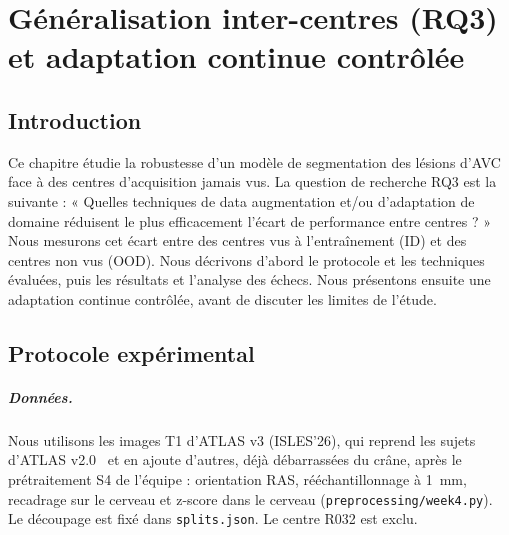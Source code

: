 
\chapter{Généralisation inter-centres (RQ3) et adaptation continue contrôlée}
\label{chap:rq3}

\section{Introduction}
\label{sec:rq3-introduction}

Ce chapitre étudie la robustesse d'un modèle de segmentation des lésions d'AVC face à des centres d'acquisition jamais vus.
La question de recherche RQ3 est la suivante : « Quelles techniques de data augmentation et/ou d'adaptation de domaine réduisent le plus efficacement l'écart de performance entre centres ? »
Nous mesurons cet écart entre des centres vus à l'entraînement (ID) et des centres non vus (OOD).
Nous décrivons d'abord le protocole et les techniques évaluées, puis les résultats et l'analyse des échecs.
Nous présentons ensuite une adaptation continue contrôlée, avant de discuter les limites de l'étude.

\section{Protocole expérimental}
\label{sec:rq3-protocole}

\paragraph{Données.}
Nous utilisons les images T1 d'ATLAS v3 (ISLES'26), qui reprend les sujets d'ATLAS v2.0~\cite{liew2022atlas} et en ajoute d'autres, déjà débarrassées du crâne, après le prétraitement S4 de l'équipe : orientation RAS, rééchantillonnage à 1~mm, recadrage sur le cerveau et z-score dans le cerveau (\nolinkurl{preprocessing/week4.py}).
Le découpage est fixé dans \nolinkurl{splits.json}. Le centre R032 est exclu.

